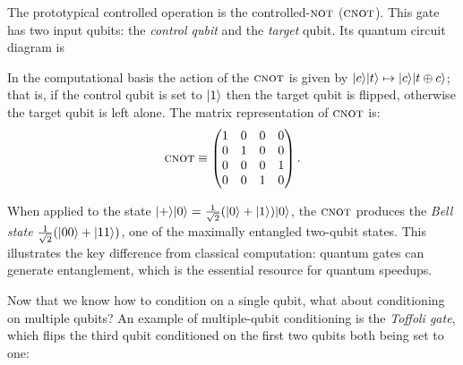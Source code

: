 The prototypical controlled operation is the controlled-$\textsc{not}$ ($\textsc{cnot}$).
This gate has two input qubits: the \emph{control qubit} and the
\emph{target} qubit.  Its quantum circuit diagram is
\begin{center}
\end{center}
In the computational basis the action of the $\textsc{cnot}$ is given by
$|c\rangle|t\rangle\mapsto |c\rangle|t\oplus c\rangle$; that is, if the control
qubit is set to $|1\rangle$ then the target qubit is flipped, otherwise the
target qubit is left alone.  The matrix representation of $\textsc{cnot}$ is:
\begin{equation}
  \textsc{cnot} \equiv \begin{pmatrix}
    1 & 0 & 0 & 0  \\
    0 & 1 & 0 & 0  \\
    0 & 0 & 0 & 1  \\
    0 & 0 & 1 & 0  \\
  \end{pmatrix}.
\end{equation}

\begin{intuition}
  When applied to the state $|+\rangle|0\rangle = \frac{1}{\sqrt{2}}(|0\rangle+|1\rangle)|0\rangle$,
  the $\textsc{cnot}$ produces the \emph{Bell state}
  $\frac{1}{\sqrt{2}}(|00\rangle+|11\rangle)$, one of the maximally entangled
  two-qubit states.  This illustrates the key difference from classical
  computation: quantum gates can generate entanglement, which is the
  essential resource for quantum speedups.
\end{intuition}

Now that we know how to condition on a single qubit, what about conditioning
on multiple qubits?  An example of multiple-qubit conditioning is the
\emph{Toffoli gate}, which flips the third qubit conditioned on the first
two qubits both being set to one:
\begin{center}
\end{center}

